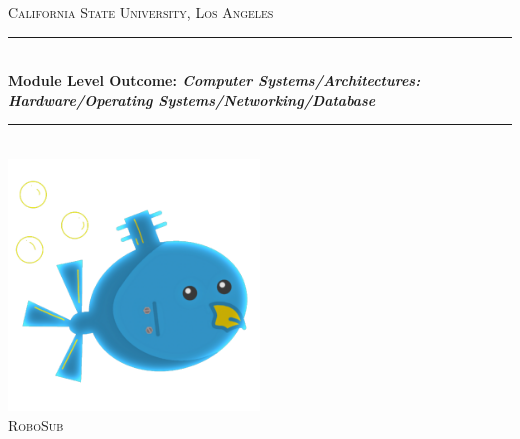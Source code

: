 \documentclass[11pt]{article}
\begin{document}
\begin{titlepage} 

	\newcommand{\HRule}{\rule{\linewidth}{0.5mm}} 
	\center %

	\textsc{\LARGE California State University, Los Angeles}\\[1.5cm] 

	\HRule\\[0.4cm]
    {\huge\bfseries Module Level Outcome: \emph{Computer Systems/Architectures:
    Hardware/Operating Systems/Networking/Database}}\\[0.4cm] 
	\HRule\\[1.5cm]

	\vfill\vfill
	\includegraphics[width=0.5\textwidth]{../../ReportTemplate/robosub_logo.png}\\[1cm] 

	\textsc{\Large RoboSub}\\[0.5cm] 


\end{titlepage}
\end{document}
